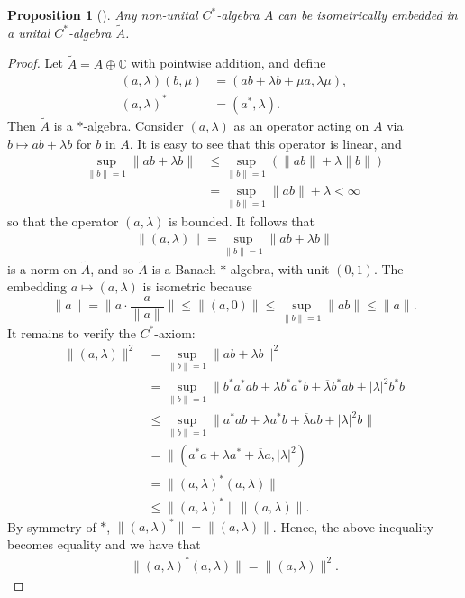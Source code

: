 \documentclass[12pt,a4paper]{report}
\theoremstyle{plain}
\newtheorem*{prop*}{Proposition}
\theoremstyle{definition}
\newcommand{\1}{\mathbbm{1}}
\newcommand{\C}{\mathbb{C}}
\begin{document}
\begin{prop*}[{\cite[I.1.3]{davidson96}}]
	Any non-unital $C^\ast$-algebra $A$ can be isometrically embedded in a unital $C^\ast$-algebra 
	$\tilde{A}$.
\end{prop*}
\begin{proof}
	Let $\tilde{A} = A \oplus \C$ with pointwise addition, and define
	\begin{align*}
		(a,\lambda) (b,\mu) &= (ab+\lambda b + \mu a, \lambda \mu),				\\
		(a,\lambda)^\ast &= (a^\ast,\overline{\lambda}).
	\end{align*}
	Then $\tilde{A}$ is a $\ast$-algebra. 
	Consider $(a,\lambda)$ as an operator acting on $A$ via $b\mapsto ab+\lambda b$ for $b$ in $A$. It 
	is easy to see that this operator is linear, and 
	\begin{align*}
				\sup_{\|b\|=1}\|ab+\lambda b\| 
		&\leq 	\sup_{\|b\|=1} (\|ab\|+ \lambda\|b\|)							\\
		&=		\sup_{\|b\|=1} \|ab\|+ \lambda < \infty
	\end{align*}
	so that the operator $(a,\lambda)$ is bounded. It follows that
	\begin{align*}
		\|(a,\lambda)\| = \sup_{\|b\|=1}\|ab+\lambda b\|
	\end{align*}
	is a norm on $\tilde{A}$, and so $\tilde{A}$ is a Banach $\ast$-algebra, with unit $(0,1)$.
	The embedding $a\mapsto(a,\lambda)$ is isometric because 
	\[
		\|a\| = \|a\cdot\frac{a}{\|a\|}\| \leq \|(a,0)\| \leq \sup_{\|b\|=1}{\|ab\|} \leq \|a\|.
	\]
	It remains to verify the $C^\ast$-axiom:
	\begin{align*}
				\|(a,\lambda)\|^2 
		&=		\sup_{\|b\|=1}{\|ab+\lambda b\|^2}								\\
		&=		\sup_{\|b\|=1}{\|b^\ast a^\ast ab 
								+\lambda b^\ast a^\ast b
								+\overline{\lambda}b^\ast a b
								+|\lambda|^2 b^\ast b}							\\
		&\leq	\sup_{\|b\|=1}{\|a^\ast ab 
								+\lambda a^\ast b
								+\overline{\lambda}a b
								+|\lambda|^2 b\|}								\\
		&=		\|(a^\ast a + \lambda a^\ast +\overline{\lambda}a,|\lambda|^2)	\\
		&= 		\|(a,\lambda)^\ast(a,\lambda)\|									\\
		&\leq	\|(a,\lambda)^\ast\| \|(a,\lambda)\|.
	\end{align*}
	By symmetry of $\ast$, $\|(a,\lambda)^\ast\| = \|(a,\lambda)\|$. 
	Hence, the above inequality becomes equality and we have that
	\begin{align*}
		\|(a,\lambda)^\ast(a,\lambda)\| = \|(a,\lambda)\|^2. 
	\end{align*}
\end{proof}
\end{document}
